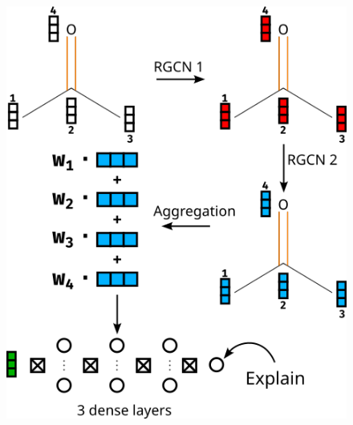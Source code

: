 \begin{figure}[h]
    \centering 
    \includegraphics{../../data/images/RGCN_model.png}
\end{figure}
